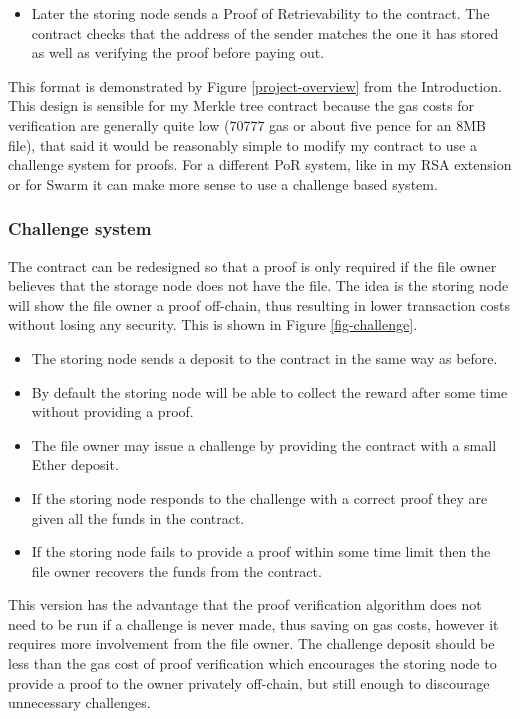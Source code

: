 \documentclass[12pt,a4paper,twoside,openright]{report}
\begin{document}
\begin{appendices}
\begin{itemize}
\item Later the storing node sends a Proof of Retrievability to the contract.
The contract checks that the address of the sender matches the one it has stored as well as verifying the proof
before paying out.
\end{itemize}

This format is demonstrated by Figure \ref{project-overview} from the Introduction.
This design is sensible for my Merkle tree contract because the gas costs for verification are generally quite low (70777 gas or about five pence for an 8MB file),
that said it would be reasonably simple to modify my contract to use a challenge system for proofs.
For a different PoR system, like in my RSA extension or for Swarm it can make more sense to use a challenge based system.




\subsubsection{Challenge system}

The contract can be redesigned so that a proof is only required if the file owner believes that the
storage node does not have the file. The idea is the storing node will show the file owner a proof off-chain,
thus resulting in lower transaction costs without losing any security.
This is shown in Figure \ref{fig-challenge}.

\begin{itemize}
\item The storing node sends a deposit to the contract in the same way as before.

\item By default the storing node will be able to collect the reward after some time without providing a proof.

\item The file owner may issue a challenge by providing the contract with a small Ether deposit.

\item If the storing node responds to the challenge with a correct proof they are given all the funds in the contract.

\item If the storing node fails to provide a proof within some time limit then the file owner recovers 
the funds from the contract.
\end{itemize}

This version has the advantage that the proof verification algorithm
does not need to be run if a challenge is never made, thus saving on gas costs,
however it requires more involvement from the file owner.
The challenge deposit should be less than the gas cost of proof verification
which encourages the storing node to provide a proof to the owner privately off-chain,
but still enough to discourage unnecessary challenges.


\end{appendices}
\end{document}

